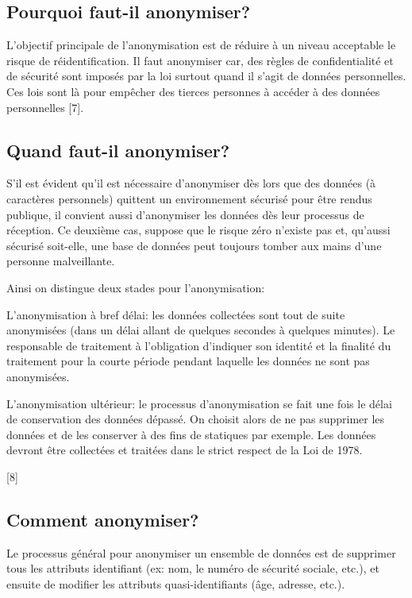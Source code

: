 \subsection{Pourquoi faut-il anonymiser?} 

L’objectif principale de l’anonymisation est de réduire à un niveau acceptable le risque de réidentification. Il faut anonymiser car, des règles de confidentialité et de sécurité sont imposés par la loi surtout quand il s’agit de données personnelles. Ces lois sont là pour empêcher des tierces personnes à accéder à des données personnelles [7]. 


\subsection{Quand faut-il anonymiser?} 

S’il est évident qu’il est nécessaire d’anonymiser dès lors que des données (à caractères personnels) quittent un environnement sécurisé pour être rendus publique, il convient aussi d’anonymiser les données dès leur processus de réception. Ce deuxième cas, suppose que le risque zéro n’existe pas et, qu’aussi sécurisé soit-elle, une base de données peut toujours tomber aux mains d’une personne malveillante. 

Ainsi on distingue deux stades pour l’anonymisation: 

L’anonymisation à bref délai: les données collectées sont tout de suite anonymisées (dans un délai allant de quelques secondes à quelques minutes). Le responsable de traitement à l’obligation d’indiquer son identité et la finalité du traitement pour la courte période pendant laquelle les données ne sont pas anonymisées.  

L’anonymisation ultérieur: le processus d’anonymisation se fait une fois le délai de conservation des données dépassé. On choisit alors de ne pas supprimer les données et de les conserver à des fins de statiques par exemple. Les données devront être collectées et traitées dans le strict respect de la Loi de 1978. 

[8] 

\subsection{Comment anonymiser?} 

Le processus général pour anonymiser un ensemble de données est de supprimer tous les attributs identifiant (ex: nom, le numéro de sécurité sociale, etc.), et ensuite de modifier les attributs quasi-identifiants (âge, adresse, etc.).  

